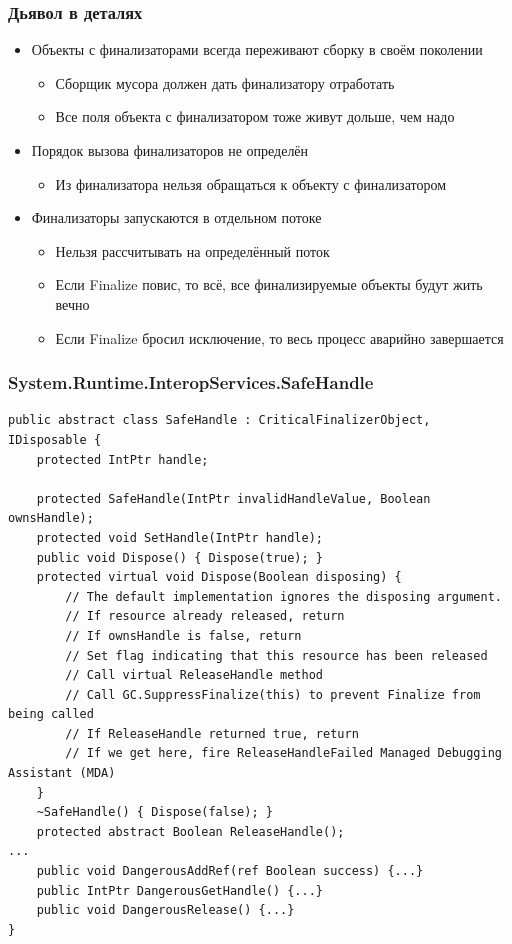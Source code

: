 \documentclass{../../slides-style}
\begin{document}
    \begin{frame}
        \frametitle{Дьявол в деталях}
        \begin{itemize}
            \item Объекты с финализаторами всегда переживают сборку в своём поколении
            \begin{itemize}
                \item Сборщик мусора должен дать финализатору отработать
                \item Все поля объекта с финализатором тоже живут дольше, чем надо
            \end{itemize}
            \item Порядок вызова финализаторов не определён
            \begin{itemize}
                \item Из финализатора нельзя обращаться к объекту с финализатором
            \end{itemize}
            \item Финализаторы запускаются в отдельном потоке
            \begin{itemize}
                \item Нельзя рассчитывать на определённый поток
                \item Если Finalize повис, то всё, все финализируемые объекты будут жить вечно
                \item Если Finalize бросил исключение, то весь процесс аварийно завершается
            \end{itemize}
        \end{itemize}
    \end{frame}

    \begin{frame}[fragile]
        \frametitle{System.Runtime.InteropServices.SafeHandle}
        \begin{scriptsize}
            \begin{verbatim}
public abstract class SafeHandle : CriticalFinalizerObject, IDisposable {
    protected IntPtr handle;

    protected SafeHandle(IntPtr invalidHandleValue, Boolean ownsHandle);
    protected void SetHandle(IntPtr handle);
    public void Dispose() { Dispose(true); }
    protected virtual void Dispose(Boolean disposing) {
        // The default implementation ignores the disposing argument.
        // If resource already released, return
        // If ownsHandle is false, return
        // Set flag indicating that this resource has been released
        // Call virtual ReleaseHandle method
        // Call GC.SuppressFinalize(this) to prevent Finalize from being called
        // If ReleaseHandle returned true, return
        // If we get here, fire ReleaseHandleFailed Managed Debugging Assistant (MDA)
    }
    ~SafeHandle() { Dispose(false); }
    protected abstract Boolean ReleaseHandle();
...
    public void DangerousAddRef(ref Boolean success) {...}
    public IntPtr DangerousGetHandle() {...}
    public void DangerousRelease() {...}
}
            \end{verbatim}
        \end{scriptsize}
    \end{frame}
\end{document}
